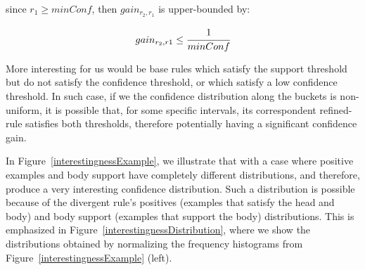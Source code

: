 since $r_1 \geq minConf$, then $gain_{r_2,r_1}$ is upper-bounded by:

\begin{equation}
 gain_{r_2,r1} \leq \cfrac{1}{minConf}
\end{equation}

More interesting for us would be base rules which satisfy the support threshold but do not satisfy the confidence
threshold, or which satisfy a low confidence threshold. In such case, if we the confidence distribution along the
buckets is non-uniform, it is possible that, for some specific intervals, its correspondent refined-rule satisfies both
thresholds, therefore potentially having a significant confidence gain.

In Figure~\ref{interestingnessExample}, we illustrate that with a case where positive examples and body
support have completely different distributions, and therefore, produce a very interesting confidence distribution. Such
a distribution is possible because of the divergent rule's positives (examples that satisfy the head
and body) and body support (examples that support the body) distributions. This is emphasized in
Figure~\ref{interestingnessDistribution}, where we show the distributions obtained by normalizing the frequency
histograms from Figure~\ref{interestingnessExample} (left).

